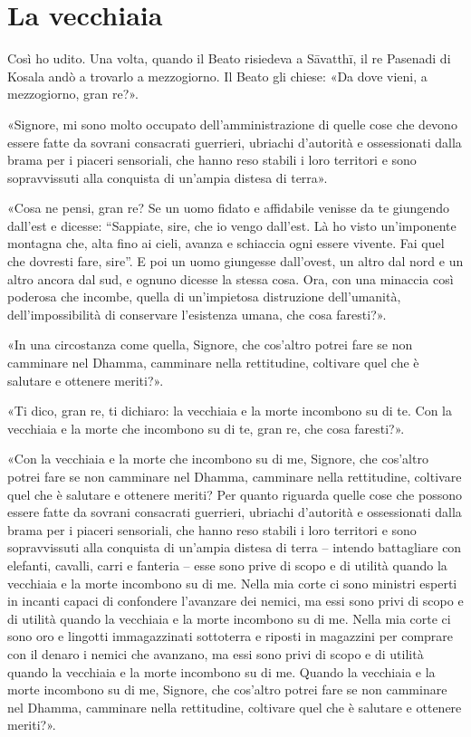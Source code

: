 \chapter{La vecchiaia}

 Così ho udito. Una volta, quando il Beato risiedeva a
Sāvatthī, il re Pasenadi di Kosala andò a trovarlo a mezzogiorno. Il Beato gli
chiese: «Da dove vieni, a mezzogiorno, gran re?».

«Signore, mi sono molto occupato dell’amministrazione di quelle cose che devono
essere fatte da sovrani consacrati guerrieri, ubriachi d’autorità e ossessionati
dalla brama per i piaceri sensoriali, che hanno reso stabili i loro territori e
sono sopravvissuti alla conquista di un’ampia distesa di terra».

«Cosa ne pensi, gran re? Se un uomo fidato e affidabile venisse da te giungendo
dall’est e dicesse: “Sappiate, sire, che io vengo dall’est. Là ho visto
un’imponente montagna che, alta fino ai cieli, avanza e schiaccia ogni essere
vivente. Fai quel che dovresti fare, sire”. E poi un uomo giungesse dall’ovest,
un altro dal nord e un altro ancora dal sud, e ognuno dicesse la stessa cosa.
Ora, con una minaccia così poderosa che incombe, quella di un’impietosa
distruzione dell’umanità, dell’impossibilità di conservare l’esistenza umana,
che cosa faresti?».

«In una circostanza come quella, Signore, che cos’altro potrei fare se non
camminare nel Dhamma, camminare nella rettitudine, coltivare quel che è salutare
e ottenere meriti?».

«Ti dico, gran re, ti dichiaro: la vecchiaia e la morte incombono su di te. Con
la vecchiaia e la morte che incombono su di te, gran re, che cosa faresti?».

«Con la vecchiaia e la morte che incombono su di me, Signore, che cos’altro
potrei fare se non camminare nel Dhamma, camminare nella rettitudine, coltivare
quel che è salutare e ottenere meriti? Per quanto riguarda quelle cose che
possono essere fatte da sovrani consacrati guerrieri, ubriachi d’autorità e
ossessionati dalla brama per i piaceri sensoriali, che hanno reso stabili i loro
territori e sono sopravvissuti alla conquista di un’ampia distesa di terra –
intendo battagliare con elefanti, cavalli, carri e fanteria – esse sono prive di
scopo e di utilità quando la vecchiaia e la morte incombono su di me. Nella mia
corte ci sono ministri esperti in incanti capaci di confondere l’avanzare dei
nemici, ma essi sono privi di scopo e di utilità quando la vecchiaia e la morte
incombono su di me. Nella mia corte ci sono oro e lingotti immagazzinati
sottoterra e riposti in magazzini per comprare con il denaro i nemici che
avanzano, ma essi sono privi di scopo e di utilità quando la vecchiaia e la
morte incombono su di me. Quando la vecchiaia e la morte incombono su di me,
Signore, che cos’altro potrei fare se non camminare nel Dhamma, camminare nella
rettitudine, coltivare quel che è salutare e ottenere meriti?».

